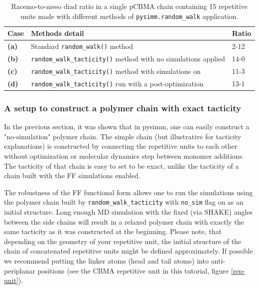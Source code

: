 \documentclass[9pt,tutorial]{livecoms}
\begin{document}
\begin{table}[h]
\setlength{\tabcolsep}{8pt}
\renewcommand{\arraystretch}{1.3}
\caption{\label{diads:distr}Racemo-to-meso diad ratio in a single pCBMA chain containing 15 repetitive units made with different methods of \lstinline$pysimm.random_walk$ application.}

\begin{tabular}{m{}  m{}  m{}}
\toprule
Case &    Methods detail        & Ratio    \\
\midrule
\textbf{(a)} & Standard \lstinline$random_walk()$ method & 2-12 \\
\textbf{(b)} & \lstinline$random_walk_tacticity()$ method with no simulations applied & 14-0 \\
\textbf{(c)} & \lstinline$random_walk_tacticity()$ method with simulations on & 11-3 \\
\textbf{(d)} & \lstinline$random_walk_tacticity()$ run with a post-optimization & 13-1 \\
\bottomrule
\end{tabular}
\medskip
\end{table}

\subsubsection{A setup to construct a polymer chain with exact tacticity}

In the previous section, it was shown that in pysimm, one can easily construct a "no-simulation" polymer chain. The simple chain (but illustrative for tacticity explanations) is constructed by connecting the repetitive units to each other without optimization or molecular dynamics step between monomer additions. The tacticity of that chain is easy to set to be exact, unlike the tacticity of a chain built with the FF simulations enabled.

The robustness of the FF functional form allows one to run the simulations using the polymer chain built by \lstinline$random_walk_tacticity$ with \lstinline$no_sim$ flag on as an initial structure. Long enough MD simulation with the fixed (via SHAKE) angles between the side chains will result in a relaxed polymer chain with exactly the same tacticity as it was constructed at the beginning. Please note, that depending on the geometry of your repetitive unit, the initial structure of the chain of concatenated repetitive units might be defined approximately. If possible we recommend putting the linker atoms (head and tail atoms) into anti-periplanar positions (see the CBMA repetitive unit in this tutorial, figure \ref{rep-unit}).
\end{document}
